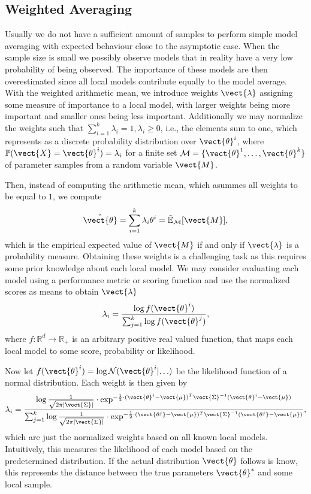 \subsection{Weighted Averaging}
Usually we do not have a sufficient amount of samples to perform simple model averaging with expected behaviour close to the asymptotic case. 
When the sample size is small we possibly observe models that in reality have a very low probability of being observed. 
The importance of these models are then overestimated since all local models contribute equally to the model average.
With the weighted arithmetic mean, we introduce  weights $\vect{\lambda}$ assigning some measure of importance to a local model, with larger weights being more important and smaller ones being less important.
Additionally we may normalize the weights such that $\sum_{i=1}^k \lambda_i = 1, \lambda_i \geq 0$, i.e., the elements sum to one, which represents as a discrete probability distribution over $\vect{\theta}^i$, where $\mathbb{P}(\vect{X} = \vect{\theta}^i) = \lambda_i$ for a finite set $\mathcal{M} = \{\vect{\theta}^1, \ldots, \vect{\theta}^k\}$ of parameter samples from a random variable $\vect{M}$.

Then, instead of computing the arithmetic mean, which asummes all weights to be equal to $1$, we compute
\begin{equation}
     \hat{\vect{\theta}} = \sum_{i=1}^k \lambda_i \theta^i = \tilde{\mathbb{E}}_{\mathcal{M}}[\vect{M}],
\end{equation}
which is the empirical expected value of $\vect{M}$ if and only if $\vect{\lambda}$ is a probability measure.
Obtaining these weights is a challenging task as this requires some prior knowledge about each local model.
We may consider evaluating each model using a performance metric or scoring function and use the normalized scores as means to obtain $\vect{\lambda}$
\begin{equation}
    \lambda_i = \frac{\log f(\vect{\theta}^i)}{\sum_{j=1}^k \log f(\vect{\theta}^j)},
\end{equation}
where $f: \mathbb{R}^d \rightarrow \mathbb{R}_+$ is an arbitrary positive real valued function, that maps each local model to some score, probability or likelihood.

Now let $f(\vect{\theta}^i) = \log \mathcal{N}(\vect{\theta}^i \lvert \ldots)$ be the likelihood function of a normal distribution.
Each weight is then given by
\begin{equation}
    \lambda_i = \frac{\log \frac{1}{\sqrt{2\pi\lvert \vect{\Sigma} \rvert}} \cdot \exp^{-\frac{1}{2} \cdot (\vect{\theta}^i - \vect{\mu})^T\vect{\Sigma}^{-1}(\vect{\theta}^i - \vect{\mu})}}{\sum_{j=1}^k \log \frac{1}{\sqrt{2\pi\lvert \vect{\Sigma} \rvert}} \cdot \exp^{-\frac{1}{2} \cdot (\vect{\theta^j} - \vect{\mu})^T\vect{\Sigma}^{-1}(\vect{\theta^j} - \vect{\mu})}},
\end{equation}
which are just the normalized weights based on all known local models.
Intuitively, this measures the likelihood of each model based on the predetermined distribution.
If the actual distribution $\vect{\theta}$ follows is know, this represents the distance between the true parameters $\vect{\theta}^*$ and some local sample.

